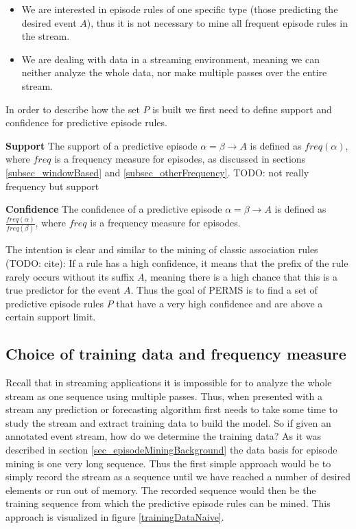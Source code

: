 \begin{itemize}
 \item We are interested in episode rules of one specific type (those predicting the desired event $A$), thus it is not necessary to mine all frequent episode rules in the stream.
 \item We are dealing with data in a streaming environment, meaning we can neither analyze the whole data, nor make multiple passes over the entire stream.
\end{itemize}

In order to describe how the set $P$ is built we first need to define support and confidence for predictive episode rules.

\begin{mydef}
\label{def_support}
\textbf{Support} The support of a predictive episode $\alpha = \beta \rightarrow A$ is defined as $freq(\alpha)$, where $freq$ is a frequency measure for episodes, as discussed in sections \ref{subsec_windowBased} and \ref{subsec_otherFrequency}. TODO: not really frequency but support
\end{mydef}

\begin{mydef}
\label{def_confidence}
\textbf{Confidence} The confidence of a predictive episode $\alpha = \beta \rightarrow A$ is defined as $\frac{freq(\alpha)}{freq(\beta)}$, where $freq$ is a frequency measure for episodes.
\end{mydef}

The intention is clear and similar to the mining of classic association rules (TODO: cite): If a rule has a high confidence, it means that the prefix of the rule rarely occurs without its suffix $A$, meaning there is a high chance that this is a true predictor for the event $A$. Thus the goal of PERMS is to find a set of predictive episode rules $P$ that have a very high confidence and are above a certain support limit.

\subsection{Choice of training data and frequency measure}
Recall that in streaming applications it is impossible for to analyze the whole stream as one sequence using multiple passes. Thus, when presented with a stream any prediction or forecasting algorithm first needs to take some time to study the stream and extract training data to build the model. So if given an annotated event stream, how do we determine the training data? As it was described in section \ref{sec_episodeMiningBackground} the data basis for episode mining is one very long sequence. Thus the first simple approach would be to simply record the stream as a sequence until we have reached a number of desired elements or run out of memory. The recorded sequence would then be the training sequence from which the predictive episode rules can be mined. This approach is visualized in figure \ref{trainingDataNaive}.

